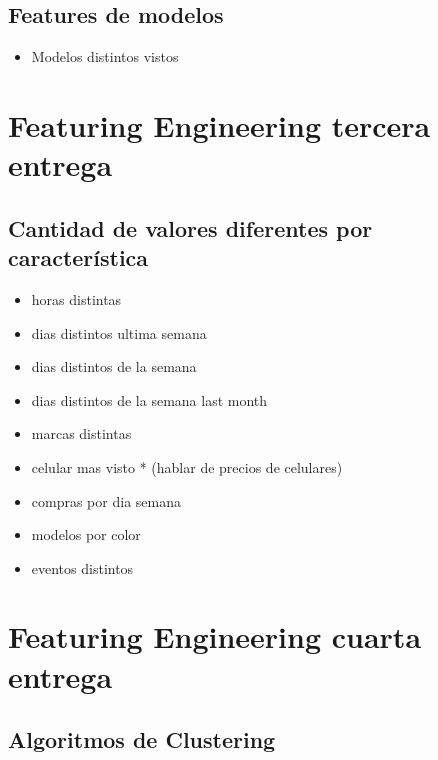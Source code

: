 \documentclass[a4paper ,12pt]{article}
\begin{document}
\subsection{Features de modelos}

	\begin{itemize}
		
		\item Modelos distintos vistos
			
	\end{itemize}	


\section{Featuring Engineering tercera entrega}

\subsection{Cantidad de valores diferentes por característica}

\begin{itemize}
	\item horas distintas

	\item dias distintos ultima semana

	\item dias distintos de la semana

	\item dias distintos de la semana last month

	\item marcas distintas

	\item celular mas visto * (hablar de precios de celulares)

	\item compras por dia semana

	\item modelos por color

	\item eventos distintos

\end{itemize}

\section{Featuring Engineering cuarta entrega}
\subsection{Algoritmos de Clustering}
\end{document}
